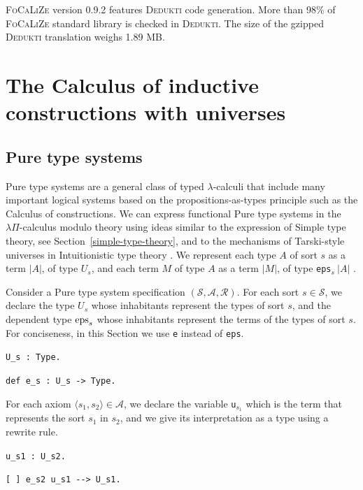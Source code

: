 \documentclass[english]{lipics}
\newcommand\lst[1]{{\rm \lstinline{#1}}}
\begin{document}
\textsc{FoCaLiZe} version 0.9.2 features \textsc{Dedukti} code generation.
More than 98\% of \textsc{FoCaLiZe} standard library is checked in
\textsc{Dedukti}.  The size of the gzipped \textsc{Dedukti}
translation weighs 1.89 MB.

\section{The Calculus of inductive constructions with universes}
\label{sec:cicw}

\subsection{Pure type systems}
\label{pure-type-systems}

Pure type systems \cite{Barendregt1992} are a general class of typed
$\lambda$-calculi that include many important logical systems based on
the propositions-as-types principle such as the Calculus of
constructions. We can express functional Pure type systems in the
$\lambda\Pi$-calculus modulo theory \cite{CousineauDowek}
using ideas similar to the
expression of Simple type
 theory, see Section~\ref{simple-type-theory}, and to the mechanisms of
Tarski-style
universes
in Intuitionistic type theory \cite{MartinLof}. We
represent each type $A$ of sort $s$ as a term $|A|$, of type
$U_s$, and each term $M$ of type $A$ as a term $|M|$, of type
\lst{eps}$_s~|A|$ \cite{CousineauDowek}.

Consider a Pure type system specification
$(\mathcal S, \mathcal A, \mathcal R)$. For each sort $s \in \mathcal
S$, we declare the type $U_s$ whose inhabitants represent the types of
sort $s$, and the dependent type $\mbox{\lst{eps}}_s$  whose inhabitants
represent the terms of the types of sort $s$. For conciseness, in this
Section we use \lst{e} instead of \lst{eps}.

\medskip

\noindent
\lst{U_s : Type.}

\noindent
\lst{def e_s : U_s -> Type.}

\medskip

\noindent
For each axiom $\langle s_1, s_2 \rangle \in \mathcal A$, we declare the
variable
\lst{u}$_{s_1}$ which is the term that represents the sort $s_1$ in $s_2$,
and we give its interpretation as a type using a rewrite rule.

\medskip

\noindent
\lst{u_s1 : U_s2.}

\noindent
\lst{[ ] e_s2 u_s1 --> U_s1.}
\end{document}
